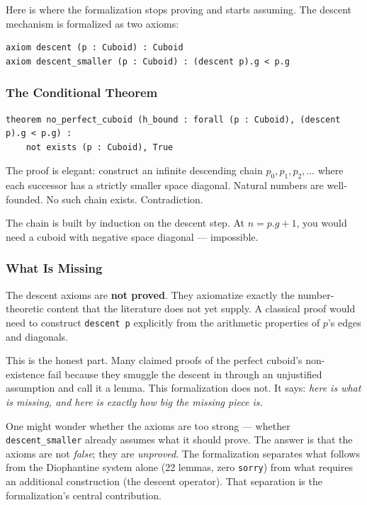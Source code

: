 \documentclass[12pt,a4paper]{article}
\begin{document}
Here is where the formalization stops proving and starts assuming. The descent mechanism is formalized as two axioms:

\begin{lstlisting}[language=lean]
axiom descent (p : Cuboid) : Cuboid
axiom descent_smaller (p : Cuboid) : (descent p).g < p.g
\end{lstlisting}

\subsubsection{The Conditional Theorem}

\begin{lstlisting}[language=lean]
theorem no_perfect_cuboid (h_bound : forall (p : Cuboid), (descent p).g < p.g) :
    not exists (p : Cuboid), True
\end{lstlisting}

The proof is elegant: construct an infinite descending chain $p_0, p_1, p_2, \ldots$ where each successor has a strictly smaller space diagonal. Natural numbers are well-founded. No such chain exists. Contradiction.

The chain is built by induction on the descent step. At $n = p.g + 1$, you would need a cuboid with negative space diagonal --- impossible.

\subsubsection{What Is Missing}

The descent axioms are \textbf{not proved}. They axiomatize exactly the number-theoretic content that the literature does not yet supply. A classical proof would need to construct \texttt{descent p} explicitly from the arithmetic properties of $p$'s edges and diagonals.

This is the honest part. Many claimed proofs of the perfect cuboid's non-existence fail because they smuggle the descent in through an unjustified assumption and call it a lemma. This formalization does not. It says: \emph{here is what is missing, and here is exactly how big the missing piece is.}

One might wonder whether the axioms are too strong --- whether \texttt{descent\_smaller} already assumes what it should prove. The answer is that the axioms are not \emph{false}; they are \emph{unproved}. The formalization separates what follows from the Diophantine system alone (22 lemmas, zero \texttt{sorry}) from what requires an additional construction (the descent operator). That separation is the formalization's central contribution.
\end{document}
